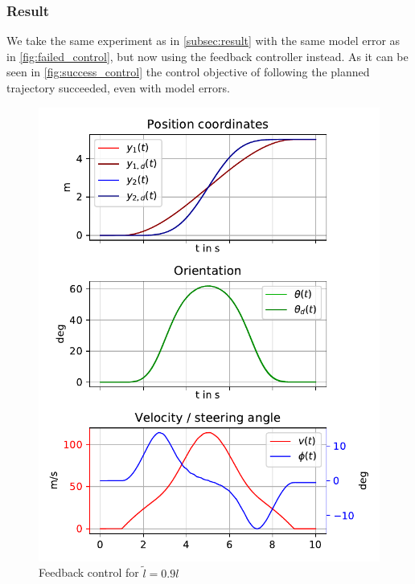 \documentclass[a4paper,11pt,headings=standardclasses,parskip=half]{scrartcl}
\begin{document}
\subsubsection{Result}
We take the same experiment as in \ref{subsec:result} with the same model error as in \autoref{fig:failed_control}, but now using the feedback controller instead. As it can be seen in \autoref{fig:success_control} the control objective of following the planned trajectory succeeded, even with model errors.
\begin{figure}[ht]
\centering
\includegraphics[scale=1]{img/successcontrol.pdf}
\caption{Feedback control for $\tilde{l}=0.9l$}
\label{fig:success_control}
\end{figure}
\printglossaries
\end{document}
